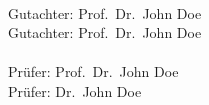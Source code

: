 \documentclass[10 pt, a4paper, twoside, openright]{Thesis}
\begin{document}
\null{}
\vfill{}
~\\Gutachter: Prof.\ Dr.\ John Doe
~\\Gutachter: Prof.\ Dr.\ John Doe
~\\
~\\Pr\"ufer: Prof.\ Dr.\ John Doe
~\\Pr\"ufer: Dr.\ John Doe








\end{document}
